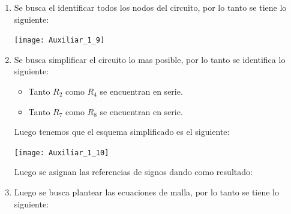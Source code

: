 \documentclass[
  11pt,
  letterpaper,
   addpoints,
   answers
  ]{exam}
\begin{document}
\begin{solution}
    \begin{enumerate}
        \item Se busca el identificar todos los nodos del circuito, por lo tanto se tiene lo siguiente:
        \begin{center}
            \texttt{[image: Auxiliar\_1\_9]}
        \end{center}
        \item Se busca simplificar el circuito lo mas posible, por lo tanto se identifica lo siguiente:
        \begin{itemize}
            \item Tanto $R_2$ como $R_4$ se encuentran en serie.
            \item Tanto $R_7$ como $R_8$ se encuentran en serie.
        \end{itemize}
        Luego tenemos que el esquema simplificado es el siguiente:
    \begin{center}
        \texttt{[image: Auxiliar\_1\_10]}
    \end{center}
    Luego se asignan las referencias de signos dando como resultado:
    \item Luego se busca plantear las ecuaciones de malla, por lo tanto se tiene lo siguiente:
   
    \end{enumerate}
\end{solution}
\end{document}
